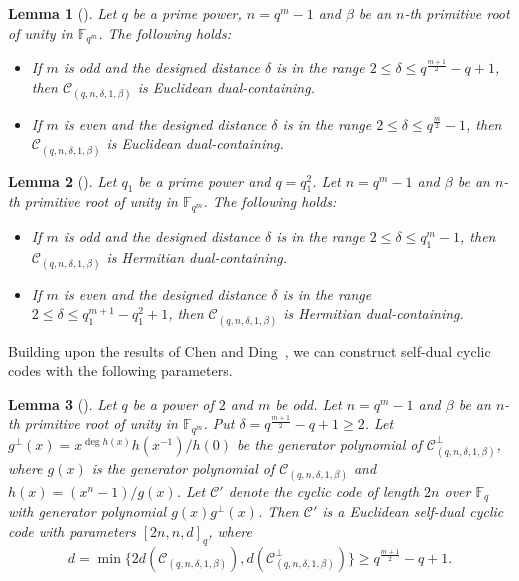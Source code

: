 \documentclass[10pt,a4paper]{amsart}
\newtheorem{lemma}{Lemma}
\begin{document}
\begin{lemma}[\cite{4106108}]
    \label{Euclidean dual-containing}
    Let $q$ be a prime power, $n=q^m-1$ and $\beta$ be an $n$-th primitive root of unity in $\mathbb{F}_{q^m}$. The following holds:
    \begin{itemize}
        \item If $m$ is odd and the designed distance $\delta$ is in the range $2\le \delta\le q^{\frac{m+1}{2}}-q+1$, then $\mathcal{C}_{(q,n,\delta,1,\beta)}$ is Euclidean dual-containing.
        \item If $m$ is even and the designed distance $\delta$ is in the range $2\le \delta\le q^{\frac{m}{2}}-1$, then $\mathcal{C}_{(q,n,\delta,1,\beta)}$ is Euclidean dual-containing.
    \end{itemize}
\end{lemma}

\begin{lemma}[\cite{4106108}]
    \label{Hermitian dual-containing}
    Let $q_1$ be a prime power and $q=q_1^2$. Let $n=q^m-1$ and $\beta$ be an $n$-th primitive root of unity in $\mathbb{F}_{q^m}$. The following holds:
    \begin{itemize}
        \item If $m$ is odd and the designed distance $\delta$ is in the range $2\le \delta\le q_1^m-1$, then $\mathcal{C}_{(q,n,\delta,1,\beta)}$ is Hermitian dual-containing.
        \item If $m$ is even and the designed distance $\delta$ is in the range $2\le \delta\le q_1^{m+1}-q_1^2+1$, then $\mathcal{C}_{(q,n,\delta,1,\beta)}$ is Hermitian dual-containing.
    \end{itemize}
    
\end{lemma}

Building upon the results of Chen and Ding~\cite{10856234}, we can construct self-dual cyclic codes with the following parameters.

\begin{lemma}[\cite{10856234}]
\label{odd Euclidean self-dual}
    Let $q$ be a power of $2$ and $m$ be odd. Let $n=q^m-1$ and $\beta$ be an $n$-th primitive root of unity in $\mathbb{F}_{q^m}$. Put $\delta=q^{\frac{m+1}{2}}-q+1\ge2$. Let $g^\perp(x)=x^{\deg h(x)}h(x^{-1})/h(0)$ be the generator polynomial of $\mathcal{C}_{(q,n,\delta,1,\beta)}^\perp$, where $g(x)$ is the generator polynomial of $\mathcal{C}_{(q,n,\delta,1,\beta)}$ and $h(x)=(x^n-1)/g(x)$. Let $\mathcal{C}'$ denote the cyclic code of length $2n$ over $\mathbb{F}_q$ with generator polynomial $g(x)g^\perp(x)$. Then $\mathcal{C}'$ is a Euclidean self-dual cyclic code with parameters $[2n,n,d]_q$, where \[d=\min\{2d(\mathcal{C}_{(q,n,\delta,1,\beta)}),d(\mathcal{C}_{(q,n,\delta,1,\beta)}^\perp)\}\ge q^{\frac{m+1}{2}}-q+1.\]
\end{lemma}
\end{document}
